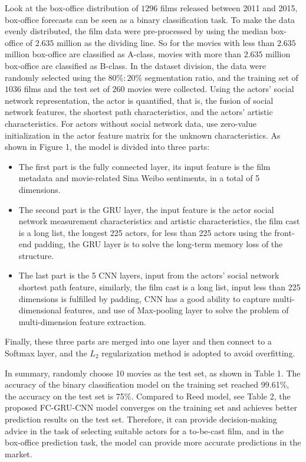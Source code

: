 \documentclass[review]{cvpr}
\begin{document}
Look at the box-office distribution of $1296$ films released between 2011 and 2015,
box-office forecasts can be seen as a binary classification task.
To make the data evenly distributed, the film data were pre-processed by using the median box-office of $2.635$ million as the dividing line.
So for the movies with  less than $2.635$ million box-office are classified as A-class, movies with more than $2.635$ million box-office are classified as B-class.
In the dataset division, the data were randomly selected using the $80\%:20\%$ segmentation ratio, and the training set of $1036$ films and the test set of $260$ movies were collected.
Using the actors' social network representation, the actor is quantified, that is,
the fusion of social network features, the shortest path characteristics, and the actors' artistic characteristics.
For actors without social network data, use zero-value initialization in the actor feature matrix for the unknown characteristics.
As shown in Figure 1, the model is divided into three parts:

\begin{itemize}
\item The first part is the fully connected layer, its input feature is the film metadata and movie-related Sina Weibo sentiments, in a total of 5 dimensions.
\item The second part is the GRU layer, the input feature is the actor social network measurement characteristics and artistic characteristics, the film cast is a long list,
the longest 225 actors, for less than 225 actors using the front-end padding, the GRU layer is to solve the long-term memory loss of the structure.
\item The last part is the 5 CNN layers, input from the actors' social network shortest path feature, similarly, the film cast is a long list,
input less than 225 dimensions is fulfilled by padding, CNN has a good ability to capture multi-dimensional features, and use of Max-pooling layer to solve the problem of multi-dimension feature extraction.
\end{itemize}
Finally, these three parts are merged into one layer and then connect to a Softmax layer, and the $L_2$ regularization method is adopted to avoid overfitting.


In summary, randomly choose 10 movies as the test set, as shown in Table 1.
The accuracy of the binary classification model on the training set reached 99.61\%, the accuracy on the test set is 75\%.
Compared to Reed \etal model, see Table 2, the proposed FC-GRU-CNN model converges on the training set and achieves better prediction results on the test set.
Therefore, it can provide decision-making advice in the task of selecting suitable actors for a to-be-cast film,
and in the box-office prediction task, the model can provide more accurate predictions in the market.
\end{document}
